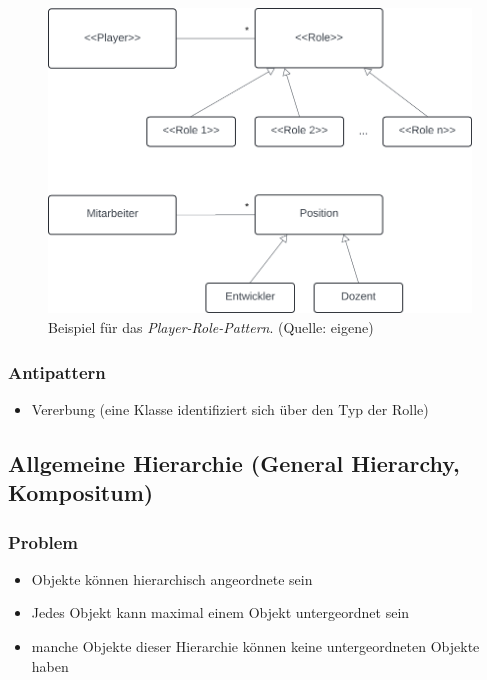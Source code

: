 \begin{figure}
    \centering
    \includegraphics[scale=0.4]{part two/Objektorientierte Analyse/img/playerrole}
    \caption{Beispiel für das \textit{Player-Role-Pattern}. (Quelle: eigene)}
    \label{fig:playerrole}
\end{figure}


\subsubsection*{Antipattern}
\begin{itemize}
    \item Vererbung (eine Klasse identifiziert sich über den Typ der Rolle)
\end{itemize}


\subsection{Allgemeine Hierarchie (General Hierarchy, Kompositum)}

\subsubsection*{Problem}
\begin{itemize}
    \item Objekte können hierarchisch angeordnete sein
    \item Jedes Objekt kann maximal einem Objekt untergeordnet sein
    \item manche Objekte dieser Hierarchie können keine untergeordneten Objekte haben
\end{itemize}

